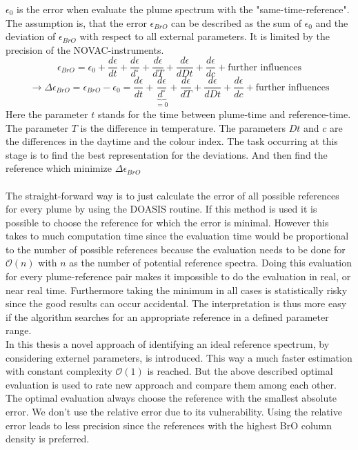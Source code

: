 \documentclass  [
  paper    = a4,
  BCOR     = 10mm,
  twoside,
  fontsize = 12pt,
  fleqn,
  toc      = bibnumbered,
  toc      = listofnumbered,
  numbers  = noendperiod,
  headings = normal,
  listof   = leveldown,
  version  = 3.03
]                                       {scrreprt}
\begin{document}
	$\epsilon_{0}$ is the  error when evaluate the plume spectrum with the "same-time-reference".
	The assumption is, that the  error $\epsilon_{BrO}$ can be described as the sum of $\epsilon_{0}$ and the deviation of $\epsilon_{BrO}$ with respect to all external parameters. It is limited by the precision of the NOVAC-instruments.
	\begin{equation}
		\epsilon_{BrO} =  \epsilon_{0}+\frac{d\epsilon}{dt}+\frac{d\epsilon}{d ^{\circ}}+\frac{d\epsilon}{dT}+\frac{d\epsilon}{dDt} +\frac{d\epsilon}{dc} + \text{further influences} 
	\end{equation}
	\begin{equation}
		\rightarrow \Delta \epsilon_{BrO} =\epsilon_{BrO} - \epsilon_{0} =\frac{d\epsilon}{dt}+\underbrace{\frac{d\epsilon}{d ^{\circ}}}_{=0}+\frac{d\epsilon}{dT}+\frac{d\epsilon}{dDt} +\frac{d\epsilon}{dc} + \text{further influences}
		\label{calc:err}
	\end{equation}
	Here the parameter $t$ stands for the time between plume-time and reference-time. The parameter $T$ is the difference in temperature. The parameters $Dt$ and $c$ are the differences in the daytime and the colour index.
	The task occurring at this stage is to find the best representation for the deviations. And then find the reference which minimize $\Delta \epsilon_{BrO} $\\
	\\
	The straight-forward way is to just calculate the  error of all possible references for every plume by using the DOASIS routine. If this method is used it is possible to choose the reference for which the  error is minimal. However this takes to much computation time since the evaluation time would be proportional to the number of possible references because the evaluation needs to be done for $\mathcal{O}(n)$ with $n$ as the number of potential reference spectra. Doing this evaluation for every plume-reference pair makes it impossible to do the evaluation in real, or near real time.
	Furthermore taking the minimum in all cases is statistically risky since the good results can occur accidental. The interpretation is thus more easy if the algorithm searches for an appropriate reference in a defined parameter range.\\
	In this thesis a novel approach of identifying an ideal reference spectrum, by considering externel parameters, is introduced. This way a much faster estimation with constant complexity $\mathcal{O}(1)$ is reached.
	But the above described optimal evaluation is used to rate new approach and compare them among each other. The optimal evaluation always choose the reference with the smallest absolute error. We don't use the relative error due to its vulnerability. Using the relative error leads to less precision since the references with the highest BrO column density is preferred.\\
\end{document}
